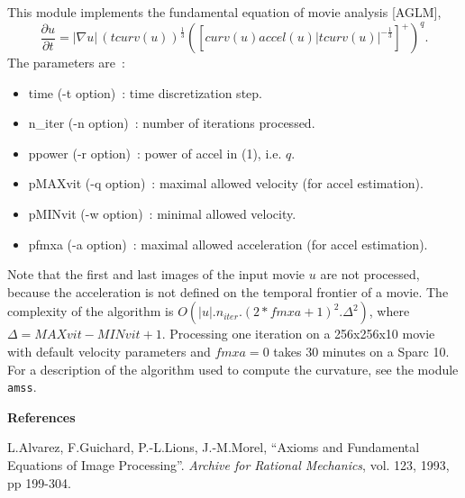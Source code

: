 This module implements the fundamental equation of movie analysis [AGLM],
\begin{equation}
\frac{\partial u}{\partial t} = |\nabla u| \,(t curv(u))^{\frac{1}{3}} \left(\left[curv(u) accel(u) |t curv(u)|^{-\frac{1}{3}} \right] ^+ \right)^q.
\end{equation}
The parameters are~:
\begin{itemize}
\item time (-t option)~: time discretization step.
\item n\_iter (-n option)~: number of iterations processed.
\item ppower (-r option)~: power of accel in (1), i.e. $q$.
\item pMAXvit (-q option)~: maximal allowed velocity (for accel estimation).
\item pMINvit (-w option)~: minimal allowed velocity.
\item pfmxa (-a option)~: maximal allowed acceleration (for accel estimation).
\end{itemize}

Note that the first and last images of the input movie $u$ are not processed, because the acceleration is not defined on the temporal frontier of a movie. 
The complexity of the algorithm is $O(|u|.n_{iter}.(2*fmxa+1)^2.\Delta ^2)$, where $\Delta =MAXvit-MINvit+1$.
Processing one iteration on a 256x256x10 movie with default velocity parameters and $fmxa=0$ takes 30 minutes on a Sparc 10. For a description
of the algorithm used to compute the curvature, see the module \verb+amss+.
 
\vskip 0.5cm
{\large \bf References}

\noindent [AGLM] L.Alvarez, F.Guichard, P.-L.Lions, J.-M.Morel, ``Axioms and Fundamental Equations of Image Processing''. {\it Archive for Rational Mechanics}, vol. 123, 1993, pp 199-304.



